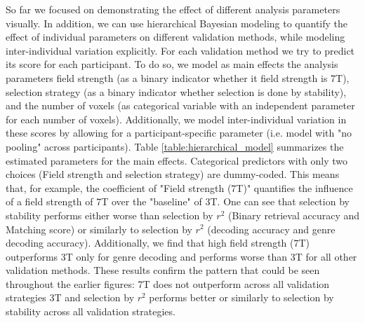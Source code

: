 So far we focused on demonstrating the effect of different analysis parameters visually.
In addition, we can use hierarchical Bayesian modeling \citep{gelman2013bayesian} to quantify the effect of individual parameters on different validation methods, while modeling inter-individual variation explicitly.
For each validation method we try to predict its score for each participant.
To do so, we model as main effects the analysis parameters field strength (as a binary indicator whether it field strength is 7T), selection strategy (as a binary indicator whether selection is done by stability), and the number of voxels (as categorical variable with an independent parameter for each number of voxels).
Additionally, we model inter-individual variation in these scores by allowing for a participant-specific parameter (i.e. model with "no pooling" across participants).
Table \ref{table:hierarchical_model} summarizes the estimated parameters for the main effects.
Categorical predictors with only two choices (Field strength and selection strategy) are dummy-coded.
This means that, for example, the coefficient of "Field strength (7T)" quantifies the influence of a field strength of 7T over the "baseline" of 3T.
One can see that selection by stability performs either worse than selection by $r^{2}$ (Binary retrieval accuracy and Matching score) or similarly to selection by $r^{2}$ (decoding accuracy and genre decoding accuracy).
Additionally, we find that high field strength (7T) outperforms 3T only for genre decoding and performs worse than 3T for all other validation methods.
These results confirm the pattern that could be seen throughout the earlier figures: 7T does not outperform across all validation strategies 3T and selection by $r^{2}$ performs better or similarly to selection by stability across all validation strategies.

